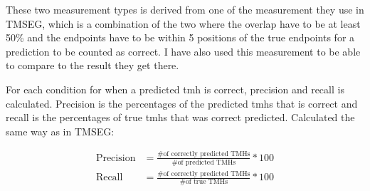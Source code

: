 These two measurement types is derived from one of the measurement they use in TMSEG,
which is a combination of the two where the overlap have to be at least 50\% and the 
endpoints have to be within 5 positions of the true endpoints for a prediction to be counted
as correct. I have also used this measurement to be able to compare to the result they get 
there. 

For each condition for when a predicted \gls{tmh} is correct, precision and recall is calculated.
Precision is the percentages of the predicted \glspl{tmh} that is correct and recall is the 
percentages of true \glspl{tmh} that was correct predicted. Calculated the same way as in TMSEG:

\begin{align*}
	\text{Precision} &= \frac{\text{\# of correctly predicted TMHs}}{\text{\# of predicted TMHs}} * 100 \\
	\text{Recall} &= \frac{\text{\# of correctly predicted TMHs}}{\text{\# of true TMHs}} * 100
\end{align*}

